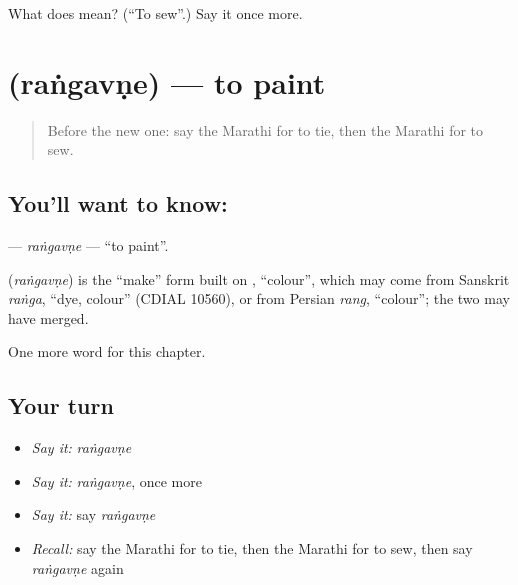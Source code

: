 \begin{tcolorbox}[breakable,colback=teal!4,colframe=teal!35!black,title={Before you move on}]
What does  mean? (\textquotedblleft{}To sew\textquotedblright{}.) Say it once more.
\end{tcolorbox}
\section[\texorpdfstring{\mr{रंगवणे} (raṅgavṇe)}{रंगवणे (raṅgavṇe)}]{ (raṅgavṇe) — to paint}

\label{lesson:MR-C155-rangavne}



\begin{quote}
Before the new one: say the Marathi for to tie, then the Marathi for to sew.
\end{quote}

\subsection*{You'll want to know: }
\textbf{} — \emph{raṅgavṇe} — \textquotedblleft{}to paint\textquotedblright{}.

\begin{cousinweb}
\textbf{} (\emph{raṅgavṇe}) is the \textquotedblleft{}make\textquotedblright{} form built on \textbf{}, \textquotedblleft{}colour\textquotedblright{}, which may come from Sanskrit \emph{raṅga}, \textquotedblleft{}dye, colour\textquotedblright{} (CDIAL 10560), or from Persian \emph{rang}, \textquotedblleft{}colour\textquotedblright{}; the two may have merged.
\end{cousinweb}

\begin{grammarlens}[title={What you've built}]
One more word for this chapter.
\end{grammarlens}

\subsection*{Your turn}
\begin{itemize}
\raggedright
  \item \emph{Say it:} \emph{raṅgavṇe}
  \item \emph{Say it:} \emph{raṅgavṇe}, once more
  \item \emph{Say it:} say \emph{raṅgavṇe}
  \item \emph{Recall:} say the Marathi for to tie, then the Marathi for to sew, then say \emph{raṅgavṇe} again
\end{itemize}

